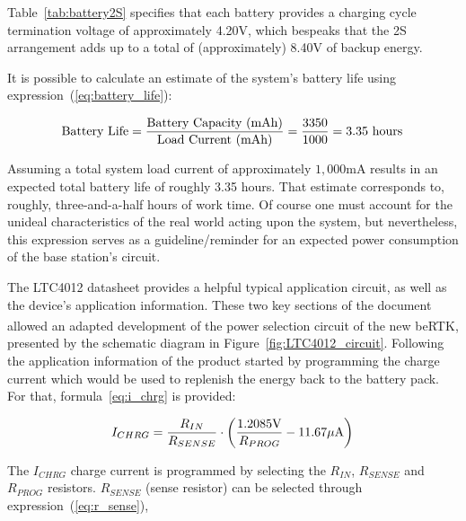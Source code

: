 Table~\ref{tab:battery2S} specifies that each battery provides a charging cycle termination voltage of approximately 4.20V, which bespeaks that the 2S arrangement adds up to a total of (approximately) 8.40V of backup energy.

It is possible to calculate an estimate of the system's battery life using expression~(\ref{eq:battery_life}):

\begin{equation}\label{eq:battery_life}
    \textrm{Battery Life} = \frac{\textrm{Battery Capacity (mAh)}}{\textrm{Load Current (mAh)}} = \frac{3350}{1000} = 3.35 \textrm{ hours}\,\medskip
\end{equation}

\noindent Assuming a total system load current of approximately $1,000$mA results in an expected total battery life of roughly 3.35 hours. That estimate corresponds to, roughly, three-and-a-half hours of work time. Of course one must account for the unideal characteristics of the real world acting upon the system, but nevertheless, this expression serves as a guideline/reminder for an expected power consumption of the base station's circuit. 

The LTC4012 datasheet provides a helpful typical application circuit, as well as the device's application information. These two key sections of the document allowed an adapted development of the power selection circuit of the new beRTK\textsuperscript{\textregistered}, presented by the schematic diagram in Figure~\ref{fig:LTC4012_circuit}. Following the application information of the product started by programming the charge current which would be used to replenish the energy back to the battery pack. For that, formula~\ref{eq:i_chrg} is provided:

\begin{equation}\label{eq:i_chrg}
    I_{CHRG}=\frac{R_{IN}}{R_{SENSE}} \cdot \left(\frac{1.2085\textrm{V}}{R_{PROG}}-11.67\mu\textrm{A}\right)\,\medskip
\end{equation}

\noindent The $I_{CHRG}$ charge current is programmed by selecting the $R_{IN}$, $R_{SENSE}$ and $R_{PROG}$ resistors. $R_{SENSE}$ (sense resistor) can be selected through expression~(\ref{eq:r_sense}),

